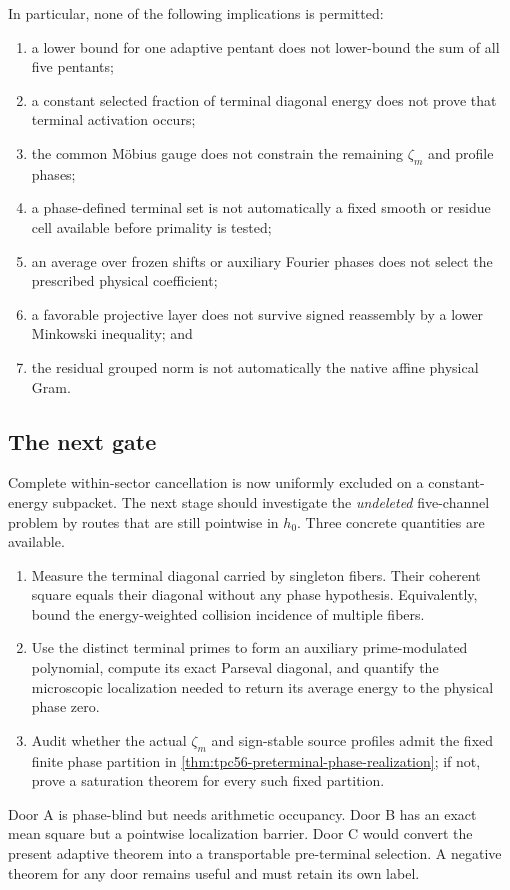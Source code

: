 In particular, none of the following implications is permitted:
\begin{enumerate}[label=\textup{(\roman*)},leftmargin=3em]
 \item a lower bound for one adaptive pentant does not lower-bound the sum
       of all five pentants;
 \item a constant selected fraction of terminal diagonal energy does not
       prove that terminal activation occurs;
 \item the common M\"obius gauge does not constrain the remaining
       \(\zeta_m\) and profile phases;
 \item a phase-defined terminal set is not automatically a fixed smooth or
       residue cell available before primality is tested;
 \item an average over frozen shifts or auxiliary Fourier phases does not
       select the prescribed physical coefficient;
 \item a favorable projective layer does not survive signed reassembly by
       a lower Minkowski inequality; and
 \item the residual grouped norm is not automatically the native affine
       physical Gram.
\end{enumerate}

\subsection{The next gate}

Complete within-sector cancellation is now uniformly excluded on a
constant-energy subpacket.  The next stage should investigate the
\emph{undeleted} five-channel problem by routes that are still pointwise in
\(h_0\).  Three concrete quantities are available.
\begin{enumerate}[label=\textbf{Door \Alph*.},leftmargin=3.8em]
 \item Measure the terminal diagonal carried by singleton fibers.  Their
       coherent square equals their diagonal without any phase hypothesis.
       Equivalently, bound the energy-weighted collision incidence of
       multiple fibers.
 \item Use the distinct terminal primes to form an auxiliary
       prime-modulated polynomial, compute its exact Parseval diagonal, and
       quantify the microscopic localization needed to return its average
       energy to the physical phase zero.
 \item Audit whether the actual \(\zeta_m\) and sign-stable source profiles
       admit the fixed finite phase partition in
       \cref{thm:tpc56-preterminal-phase-realization}; if not, prove a
       saturation theorem for every such fixed partition.
\end{enumerate}
Door A is phase-blind but needs arithmetic occupancy.  Door B has an exact
mean square but a pointwise localization barrier.  Door C would convert the
present adaptive theorem into a transportable pre-terminal selection.  A
negative theorem for any door remains useful and must retain its own label.

